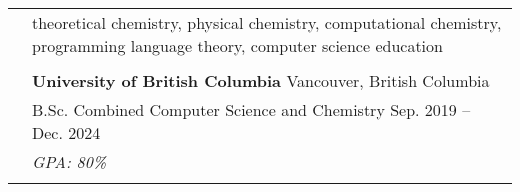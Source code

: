 \documentclass[letterpaper, 11pt]{article}
\begin{document}

\vspace{0.5cm}


\setlength{\tabcolsep}{8pt}

\begin{longtable}{p{1.3in}p{4.8in}}

	\nohyphens{\color{Blue}{Research Interests}}
	 & theoretical chemistry, physical chemistry, computational chemistry, programming language theory, computer science education                                                                                           \\
	 &                                                                                                                                                                                                        \\

	\color{Blue}{Education}
	 & \textbf{University of British Columbia} \hfill Vancouver, British Columbia                                                                                                                             \\
	 & B.Sc. Combined Computer Science and Chemistry \hfill Sep. 2019 -- Dec. 2024                                                                                                                            \\
	 & {\it GPA: 80\%}                                                                                                                                                                                        \\
	 &                                                                                                                                                                                                        \\


\end{longtable}
\end{document}
